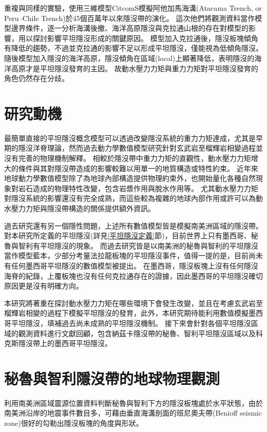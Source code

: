 \citealp{Hu2016}重複與\citealp{Manea2012Chile}同樣的實驗，使用三維模型CitcomS模擬阿他加馬海溝(Atacama Trench, or Peru–Chile Trench)於45個百萬年以來隱沒帶的演化。
這次他們將觀測資料當作模型邊界條件，逐一分析海溝後撤、海洋高原隱沒與克拉通山根的存在對模型的影響，用以探討影響平坦隱沒形成的關鍵原因。
模型加入克拉通後，隱沒板塊傾角有降低的趨勢，不過並克拉通的影響不足以形成平坦隱沒，僅能視為低傾角隱沒。
隨後模型加入隱沒的海洋高原，隱沒傾角在區域(local)上顯著降低，表明隱沒的海洋高原才是平坦隱沒發育的主因。
故動水壓力力矩與重力力矩對平坦隱沒發育的角色仍然存在分歧。

\section{研究動機}\label{研究動機}
最簡單直接的平坦隱沒概念模型可以透過改變隱沒系統的重力力矩達成，尤其是早期的隱沒洋脊理論，然而過去動力學數值模型研究針對玄武岩至榴輝岩相變過程並沒有完善的物理機制解釋。
相較於隱沒帶中重力力矩的直觀性，動水壓力力矩增大的條件與其對隱沒帶造成的影響較難以用單一的地質構造或特性約束。
近年來地球動力學數值模型除了為地球內部構造提供物理約束外，也開始量化各種自然現象對岩石造成的物理特性改變，包含岩漿作用與脫水作用等。
尤其動水壓力力矩對隱沒系統的影響還沒有完全成熟，而這些較為複雜的地球內部作用或許可以為動水壓力力矩與隱沒帶構造的關係提供額外資訊。

過去研究還有另一個隱性問題，上述所有數值模型皆是模擬南美洲區域的隱沒帶。
對本研究所定義的平坦隱沒(詳見\ref{平坦隱沒定義}節)，目前世界上只有墨西哥、秘魯與智利有平坦隱沒的現象。
而過去研究皆是以南美洲的秘魯與智利的平坦隱沒當作模型藍本，少部分考量法拉龍板塊的平坦隱沒事件，值得一提的是，目前尚未有任何墨西哥平坦隱沒的數值模型被提出。
在墨西哥，隱沒板塊上沒有任何隱沒海脊的紀錄，上覆板塊也沒有任何克拉通存在的證據，因此墨西哥的平坦隱沒確切原因更是沒有明確方向。

本研究將著重在探討動水壓力力矩在哪些環境下會發生改變，並且在考慮玄武岩至榴輝岩相變的過程下模擬平坦隱沒的發育，此外，本研究期待能利用數值模擬墨西哥平坦隱沒，填補過去尚未成熟的平坦隱沒機制。
接下來會針對各個平坦隱沒區域的觀測資料進行文獻回顧，包含納茲卡隱沒帶的秘魯、智利平坦隱沒區域以及科克斯隱沒帶上的墨西哥平坦隱沒。


\section{秘魯與智利隱沒帶的地球物理觀測}\label{秘魯與智利隱沒帶地球物理觀測}
\citet{barazangi1976}利用南美洲區域震源位置資料判斷秘魯與智利下方的隱沒板塊處於水平狀態，由於南美洲沿岸的地震事件數目多，可藉由垂直海溝剖面的班尼奧夫帶(Benioff seismic zone)很好的勾勒出隱沒板塊的角度與形狀。

